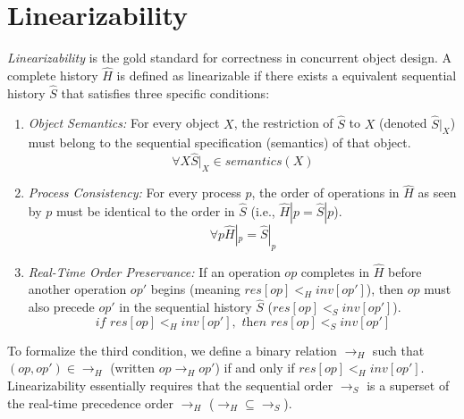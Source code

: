 \section{Linearizability}
\textit{Linearizability} is the gold standard for correctness in concurrent object design. A complete history $\widehat{H}$ is defined as linearizable if there exists a equivalent sequential history $\widehat{S}$ that satisfies three specific conditions:
\begin{enumerate}
    \item \textit{Object Semantics:} For every object $X$, the restriction of $\widehat{S}$ to $X$ (denoted $\widehat{S}|_X$) must belong to the sequential specification (semantics) of that object.
    \begin{equation*}
        \forall X \widehat{S}|_X\in semantics(X)
    \end{equation*}
    \item \textit{Process Consistency:} For every process $p$, the order of operations in $\widehat{H}$ as seen by $p$ must be identical to the order in $\widehat{S}$ (i.e., $\widehat{H}|p=\widehat{S}|p$).
    \begin{equation*}
        \forall p \widehat{H}|_p = \widehat{S}|_p
    \end{equation*}
    \item \textit{Real-Time Order Preservance:} If an operation $op$ completes in $\widehat{H}$ before another operation $op'$ begins (meaning $res[op]<_H inv[op']$), then $op$ must also precede $op'$ in the sequential history $\widehat{S}$ ($res[op]<_S inv[op']$).
    \begin{equation*}
        \textit{if }res[op] <_H inv[op'],\textit{ then }res[op] <_S inv[op']
    \end{equation*}
\end{enumerate}

To formalize the third condition, we define a binary relation $\longrightarrow_H$ such that $(op,op')\in\longrightarrow_H$ (written $op\longrightarrow_H op'$) if and only if $res[op]<_H inv[op']$. Linearizability essentially requires that the sequential order $\longrightarrow_S$ is a superset of the real-time precedence order $\longrightarrow_H$ ($\longrightarrow_H \subseteq \longrightarrow_S$).

